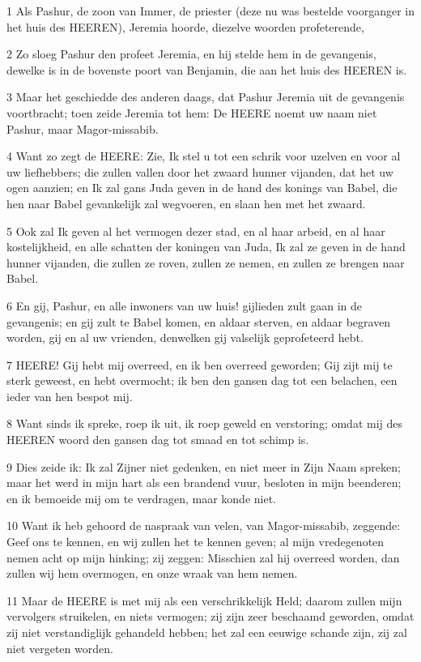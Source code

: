 \par 1 Als Pashur, de zoon van Immer, de priester (deze nu was bestelde voorganger in het huis des HEEREN), Jeremia hoorde, diezelve woorden profeterende,
\par 2 Zo sloeg Pashur den profeet Jeremia, en hij stelde hem in de gevangenis, dewelke is in de bovenste poort van Benjamin, die aan het huis des HEEREN is.
\par 3 Maar het geschiedde des anderen daags, dat Pashur Jeremia uit de gevangenis voortbracht; toen zeide Jeremia tot hem: De HEERE noemt uw naam niet Pashur, maar Magor-missabib.
\par 4 Want zo zegt de HEERE: Zie, Ik stel u tot een schrik voor uzelven en voor al uw liefhebbers; die zullen vallen door het zwaard hunner vijanden, dat het uw ogen aanzien; en Ik zal gans Juda geven in de hand des konings van Babel, die hen naar Babel gevankelijk zal wegvoeren, en slaan hen met het zwaard.
\par 5 Ook zal Ik geven al het vermogen dezer stad, en al haar arbeid, en al haar kostelijkheid, en alle schatten der koningen van Juda, Ik zal ze geven in de hand hunner vijanden, die zullen ze roven, zullen ze nemen, en zullen ze brengen naar Babel.
\par 6 En gij, Pashur, en alle inwoners van uw huis! gijlieden zult gaan in de gevangenis; en gij zult te Babel komen, en aldaar sterven, en aldaar begraven worden, gij en al uw vrienden, denwelken gij valselijk geprofeteerd hebt.
\par 7 HEERE! Gij hebt mij overreed, en ik ben overreed geworden; Gij zijt mij te sterk geweest, en hebt overmocht; ik ben den gansen dag tot een belachen, een ieder van hen bespot mij.
\par 8 Want sinds ik spreke, roep ik uit, ik roep geweld en verstoring; omdat mij des HEEREN woord den gansen dag tot smaad en tot schimp is.
\par 9 Dies zeide ik: Ik zal Zijner niet gedenken, en niet meer in Zijn Naam spreken; maar het werd in mijn hart als een brandend vuur, besloten in mijn beenderen; en ik bemoeide mij om te verdragen, maar konde niet.
\par 10 Want ik heb gehoord de naspraak van velen, van Magor-missabib, zeggende: Geef ons te kennen, en wij zullen het te kennen geven; al mijn vredegenoten nemen acht op mijn hinking; zij zeggen: Misschien zal hij overreed worden, dan zullen wij hem overmogen, en onze wraak van hem nemen.
\par 11 Maar de HEERE is met mij als een verschrikkelijk Held; daarom zullen mijn vervolgers struikelen, en niets vermogen; zij zijn zeer beschaamd geworden, omdat zij niet verstandiglijk gehandeld hebben; het zal een eeuwige schande zijn, zij zal niet vergeten worden.
